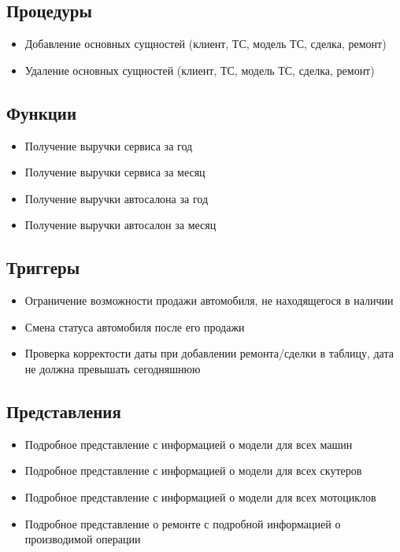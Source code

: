 \documentclass[12 pt, a4paper]{article}
\begin{document}
\subsection{Процедуры}
\begin{itemize}
\item Добавление основных сущностей (клиент, ТС, модель ТС, сделка, ремонт)
\item Удаление основных сущностей (клиент, ТС, модель ТС, сделка, ремонт)
\end{itemize}

\subsection{Функции}
\begin{itemize}
\item Получение выручки сервиса за год
\item Получение выручки сервиса за месяц 
\item Получение выручки автосалона за год
\item Получение выручки автосалон за месяц
\end{itemize}

\subsection{Триггеры}
\begin{itemize}
\item Ограничение возможности продажи автомобиля, не находящегося в наличии
\item Смена статуса автомобиля после его продажи
\item Проверка корректости даты при добавлении ремонта/сделки в таблицу, дата не должна превышать сегодняшнюю
\end{itemize}

\subsection{Представления}
\begin{itemize}
\item Подробное представление с информацией о модели для всех машин
\item Подробное представление с информацией о модели для всех скутеров 
\item Подробное представление с информацией о модели для всех мотоциклов
\item Подробное представление о ремонте с подробной информацией о производимой операции
\end{itemize}
\end{document}
